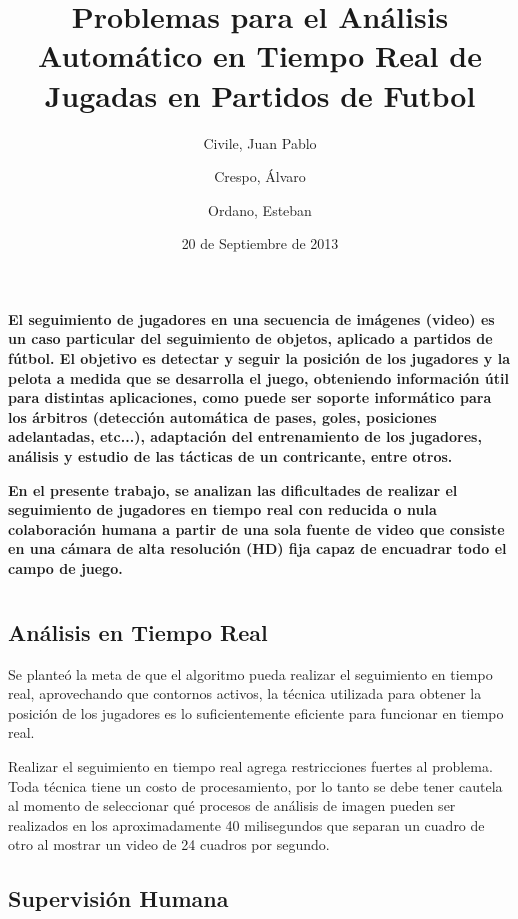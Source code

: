 \documentclass[a4paper,10pt]{article}
\title{Problemas para el Análisis Automático en Tiempo Real de Jugadas en Partidos de Futbol}
\date{20 de Septiembre de 2013}
\author{Civile, Juan Pablo \and Crespo, Álvaro \and Ordano, Esteban }
\begin{document}
\pagestyle{fancy}
\maketitle
\thispagestyle{fancy}

\begin{customabstract}
\textbf{
El seguimiento de jugadores en una secuencia de imágenes (video) es un caso
particular del seguimiento de objetos, aplicado a partidos de fútbol. El
objetivo es detectar y seguir la posición de los jugadores y la pelota a medida
que se desarrolla el juego, obteniendo información útil para distintas
aplicaciones, como puede ser soporte informático para los árbitros (detección
automática de pases, goles, posiciones adelantadas, etc...), adaptación del
entrenamiento de los jugadores, análisis y estudio de las tácticas de un
contricante, entre otros.
}

\textbf{
En el presente trabajo, se analizan las dificultades de realizar el seguimiento
de jugadores en tiempo real con reducida o nula colaboración humana a partir de
una sola fuente de video que consiste en una cámara de alta resolución (HD)
fija capaz de encuadrar todo el campo de juego.
}
\end{customabstract}

\section{}

\subsection{Análisis en Tiempo Real}

Se planteó la meta de que el algoritmo pueda realizar el seguimiento en tiempo
real, aprovechando que contornos activos, la técnica utilizada para obtener la
posición de los jugadores es lo suficientemente eficiente para funcionar en
tiempo real.

Realizar el seguimiento en tiempo real agrega restricciones fuertes al
problema. Toda técnica tiene un costo de procesamiento, por lo tanto se debe
tener cautela al momento de seleccionar qué procesos de análisis de imagen
pueden ser realizados en los aproximadamente 40 milisegundos que separan un
cuadro de otro al mostrar un video de 24 cuadros por segundo.

\subsection{Supervisión Humana}
\end{document}
